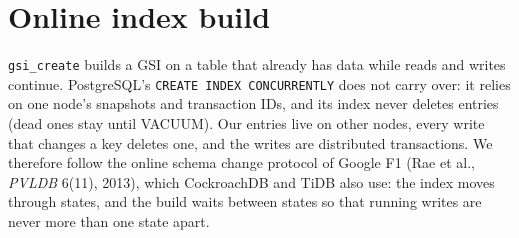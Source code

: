 \documentclass[11pt,a4paper]{article}
\begin{document}
\section{Online index build}\label{sec:build}
\texttt{gsi\_create} builds a GSI on a table that already has data while reads and writes continue.
PostgreSQL's \texttt{CREATE INDEX CONCURRENTLY} does not carry over: it relies on one node's snapshots
and transaction IDs, and its index never deletes entries (dead ones stay until VACUUM). Our entries live
on other nodes, every write that changes a key deletes one, and the writes are distributed transactions.
We therefore follow the online schema change protocol of Google F1 (Rae et al., \emph{PVLDB} 6(11),
2013), which CockroachDB and TiDB also use: the index moves through states, and the build waits between
states so that running writes are never more than one state apart.
\end{document}
